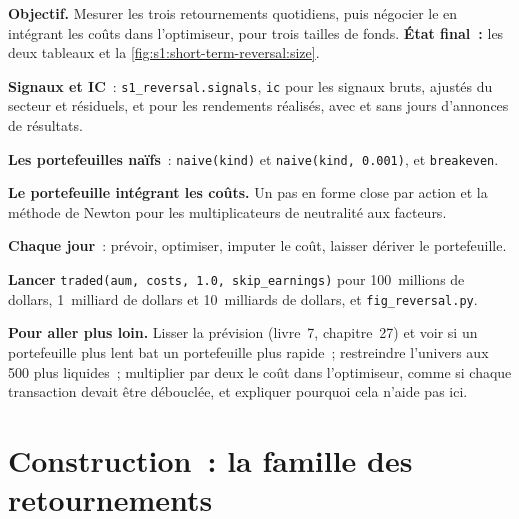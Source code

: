 \begin{tutorial}
\textbf{Objectif.} Mesurer les trois retournements quotidiens, puis négocier le  en intégrant les coûts dans l'optimiseur, pour trois tailles de fonds. \textbf{État final~:} les deux
tableaux et la \cref{fig:s1:short-term-reversal:size}.
\begin{tutsteps}
\item \textbf{Signaux et IC}~: \texttt{s1\_reversal.signals}, \texttt{ic} pour les signaux bruts, ajustés du secteur et résiduels, et pour les rendements réalisés, avec et sans jours d'annonces de résultats.
\item \textbf{Les portefeuilles naïfs}~: \texttt{naive(kind)} et \texttt{naive(kind, 0.001)}, et \texttt{breakeven}.
\item \textbf{Le portefeuille intégrant les coûts.} Un pas en forme close par action et la méthode de Newton pour les multiplicateurs de neutralité aux facteurs.
\label{lst:s1:short-term-reversal:book}
\item \textbf{Chaque jour}~: prévoir, optimiser, imputer le coût, laisser dériver le portefeuille.
\label{lst:s1:short-term-reversal:loop}
\item \textbf{Lancer} \texttt{traded(aum, costs, 1.0, skip\_earnings)} pour 100~millions de dollars, 1~milliard de dollars et 10~milliards de dollars, et \texttt{fig\_reversal.py}.
\end{tutsteps}
\textbf{Pour aller plus loin.} Lisser la prévision (livre~7, chapitre~27) et voir si un portefeuille plus lent bat un portefeuille plus rapide~; restreindre l'univers aux 500 plus
liquides~; multiplier par deux le coût dans l'optimiseur, comme si chaque transaction devait être débouclée, et expliquer pourquoi cela n'aide pas ici.
\end{tutorial}

\section{Construction~: la famille des retournements}\label{bld:s1:short-term-reversal:reversal}

